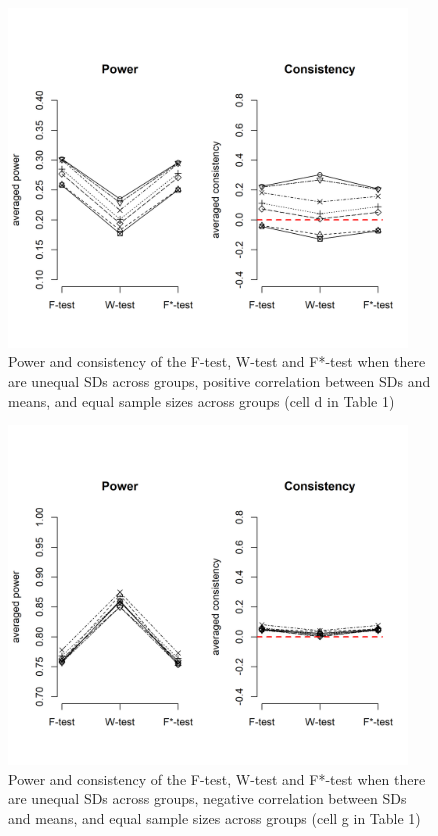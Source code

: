 \documentclass[man,floatsintext]{apa6}
\begin{document}
\begin{figure}
\includegraphics[width=400px]{Rmarkdown folder/Rmarkdown inputs/Fig2d} \caption{Power and consistency of the F-test, W-test and F*-test when there are unequal SDs across groups, positive correlation between SDs and means, and equal sample sizes across groups (cell d in Table 1)}\label{fig:unnamed-chunk-10}
\end{figure}

\begin{figure}
\includegraphics[width=400px]{Rmarkdown folder/Rmarkdown inputs/Fig2e} \caption{Power and consistency of the F-test, W-test and F*-test when there are unequal SDs across groups, negative correlation between SDs and means, and equal sample sizes across groups (cell g in Table 1)}\label{fig:unnamed-chunk-11}
\end{figure}
\end{document}
